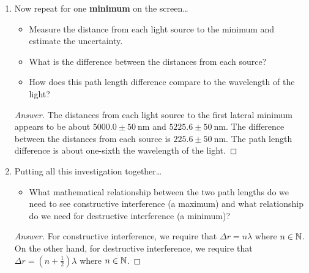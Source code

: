 \documentclass{article}
\begin{document}
\begin{enumerate}
\begin{itemize}
        \item How does this path length difference compare to the wavelength of the light?        
    \end{itemize}
    \begin{proof}[Answer]
        Again, I'm choosing green light with source separation of $\SI{1500}{\nano\meter}$.\par
        From crest to crest, the in-simulation ruler tells us that the wavelength appears to be about $587.6\pm\SI{50}{\nano\meter}$. The distance from each light source to the central maximum appears to be about $5073.2\pm\SI{50}{\nano\meter}$. The difference between the distances from each source is zero. The path length difference is negligible compared to the wavelength of the light.
    \end{proof}
    \item Now repeat for one \textbf{minimum} on the screen\dots
    \begin{itemize}
        \item Measure the distance from each light source to the minimum and estimate the uncertainty.
        \item What is the difference between the distances from each source?
        \item How does this path length difference compare to the wavelength of the light?        
    \end{itemize}
    \begin{proof}[Answer]
        The distances from each light source to the first lateral minimum appears to be about $5000.0\pm\SI{50}{\nano\meter}$ and $5225.6\pm\SI{50}{\nano\meter}$. The difference between the distances from each source is $225.6\pm\SI{50}{\nano\meter}$. The path length difference is about one-sixth the wavelength of the light.
    \end{proof}
    \item Putting all this investigation together\dots
    \begin{itemize}
        \item What mathematical relationship between the two path lengths do we need to see constructive interference (a maximum) and what relationship do we need for destructive interference (a minimum)?
    \end{itemize}
    \begin{proof}[Answer]
        For constructive interference, we require that $\Delta r=n\lambda$ where $n\in\mathbb{N}$. On the other hand, for destructive interference, we require that $\Delta r=(n+\frac{1}{2})\lambda$ where $n\in\mathbb{N}$.
    \end{proof}
\end{enumerate}
\end{document}
